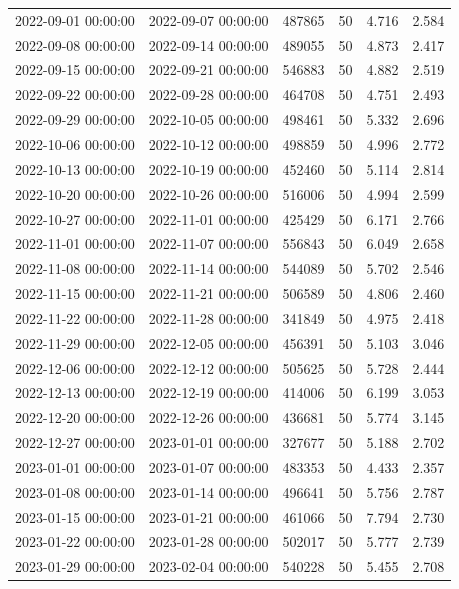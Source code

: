 \begin{tabular}{llrrrr}
2022-09-01 00:00:00 & 2022-09-07 00:00:00 & 487865 & 50 & 4.716 & 2.584 \\
2022-09-08 00:00:00 & 2022-09-14 00:00:00 & 489055 & 50 & 4.873 & 2.417 \\
2022-09-15 00:00:00 & 2022-09-21 00:00:00 & 546883 & 50 & 4.882 & 2.519 \\
2022-09-22 00:00:00 & 2022-09-28 00:00:00 & 464708 & 50 & 4.751 & 2.493 \\
2022-09-29 00:00:00 & 2022-10-05 00:00:00 & 498461 & 50 & 5.332 & 2.696 \\
2022-10-06 00:00:00 & 2022-10-12 00:00:00 & 498859 & 50 & 4.996 & 2.772 \\
2022-10-13 00:00:00 & 2022-10-19 00:00:00 & 452460 & 50 & 5.114 & 2.814 \\
2022-10-20 00:00:00 & 2022-10-26 00:00:00 & 516006 & 50 & 4.994 & 2.599 \\
2022-10-27 00:00:00 & 2022-11-01 00:00:00 & 425429 & 50 & 6.171 & 2.766 \\
2022-11-01 00:00:00 & 2022-11-07 00:00:00 & 556843 & 50 & 6.049 & 2.658 \\
2022-11-08 00:00:00 & 2022-11-14 00:00:00 & 544089 & 50 & 5.702 & 2.546 \\
2022-11-15 00:00:00 & 2022-11-21 00:00:00 & 506589 & 50 & 4.806 & 2.460 \\
2022-11-22 00:00:00 & 2022-11-28 00:00:00 & 341849 & 50 & 4.975 & 2.418 \\
2022-11-29 00:00:00 & 2022-12-05 00:00:00 & 456391 & 50 & 5.103 & 3.046 \\
2022-12-06 00:00:00 & 2022-12-12 00:00:00 & 505625 & 50 & 5.728 & 2.444 \\
2022-12-13 00:00:00 & 2022-12-19 00:00:00 & 414006 & 50 & 6.199 & 3.053 \\
2022-12-20 00:00:00 & 2022-12-26 00:00:00 & 436681 & 50 & 5.774 & 3.145 \\
2022-12-27 00:00:00 & 2023-01-01 00:00:00 & 327677 & 50 & 5.188 & 2.702 \\
2023-01-01 00:00:00 & 2023-01-07 00:00:00 & 483353 & 50 & 4.433 & 2.357 \\
2023-01-08 00:00:00 & 2023-01-14 00:00:00 & 496641 & 50 & 5.756 & 2.787 \\
2023-01-15 00:00:00 & 2023-01-21 00:00:00 & 461066 & 50 & 7.794 & 2.730 \\
2023-01-22 00:00:00 & 2023-01-28 00:00:00 & 502017 & 50 & 5.777 & 2.739 \\
2023-01-29 00:00:00 & 2023-02-04 00:00:00 & 540228 & 50 & 5.455 & 2.708 \\

\end{tabular}
